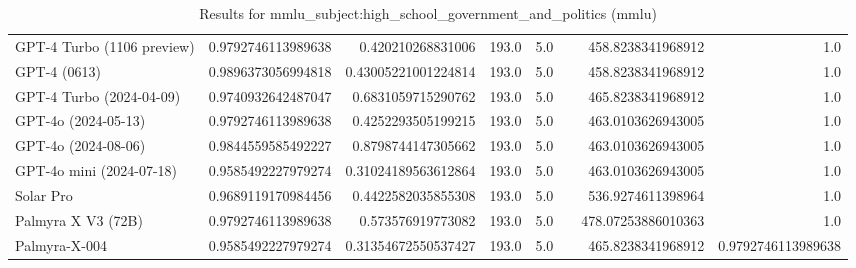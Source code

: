 \begin{table}[htp]
{\begin{tabular}{lrrrrrrr}
GPT-4 Turbo (1106 preview) & 0.9792746113989638 & 0.420210268831006 & 193.0 & 5.0 &  & 458.8238341968912 & 1.0 \\
GPT-4 (0613) & 0.9896373056994818 & 0.43005221001224814 & 193.0 & 5.0 &  & 458.8238341968912 & 1.0 \\
GPT-4 Turbo (2024-04-09) & 0.9740932642487047 & 0.6831059715290762 & 193.0 & 5.0 &  & 465.8238341968912 & 1.0 \\
GPT-4o (2024-05-13) & 0.9792746113989638 & 0.4252293505199215 & 193.0 & 5.0 &  & 463.0103626943005 & 1.0 \\
GPT-4o (2024-08-06) & 0.9844559585492227 & 0.8798744147305662 & 193.0 & 5.0 &  & 463.0103626943005 & 1.0 \\
GPT-4o mini (2024-07-18) & 0.9585492227979274 & 0.31024189563612864 & 193.0 & 5.0 &  & 463.0103626943005 & 1.0 \\
Solar Pro & 0.9689119170984456 & 0.4422582035855308 & 193.0 & 5.0 &  & 536.9274611398964 & 1.0 \\
Palmyra X V3 (72B) & 0.9792746113989638 & 0.573576919773082 & 193.0 & 5.0 &  & 478.07253886010363 & 1.0 \\
Palmyra-X-004 & 0.9585492227979274 & 0.31354672550537427 & 193.0 & 5.0 &  & 465.8238341968912 & 0.9792746113989638 \\
\bottomrule
\end{tabular}}
\caption{Results for mmlu_subject:high_school_government_and_politics (mmlu)}
\label{fig:mmlu_subject:high_school_government_and_politics (mmlu)}
\end{table}